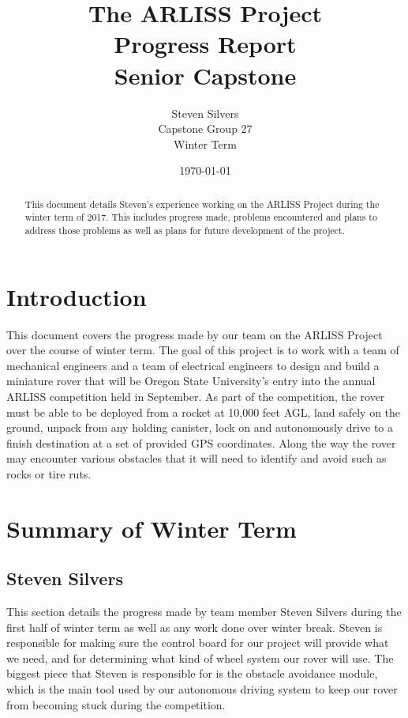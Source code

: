 \documentclass[10pt,letterpaper,onecolumn,draftclsnofoot,journal]{IEEEtran}
\begin{document}
\begin{titlepage}
	\title{The ARLISS Project\\Progress Report\\Senior Capstone}
	\author{Steven Silvers\\
		Capstone Group 27\\Winter Term}
	\date{\today}
	\maketitle
	\vspace{4cm}
	\begin{abstract}
		\noindent This document details Steven's experience working on the ARLISS Project during the winter term of 2017. This includes progress made, problems encountered and plans to address those problems as well as plans for future development of the project.
	\end{abstract}

\end{titlepage}
\tableofcontents
\clearpage

\section{Introduction}
\par
This document covers the progress made by our team on the ARLISS Project over the course of winter term. The goal of this project is to work with a team of mechanical engineers and a team of electrical engineers to design and build a miniature rover that will be Oregon State University's entry into the annual ARLISS competition held in September. As part of the competition, the rover must be able to be deployed from a rocket at 10,000 feet AGL, land safely on the ground, unpack from any holding canister, lock on and autonomously drive to a finish destination at a set of provided GPS coordinates. Along the way the rover may encounter various obstacles that it will need to identify and avoid such as rocks or tire ruts.




\section{Summary of Winter Term}


\subsection{Steven Silvers}
This section details the progress made by team member Steven Silvers during the first half of winter term  as well as any work done over winter break. Steven is responsible for making sure the control board for our project will provide what we need, and for determining what kind of wheel system our rover will use. The biggest piece that Steven is responsible for is the obstacle avoidance module, which is the main tool used by our autonomous driving system to keep our rover from becoming stuck during the competition.
\end{document}
